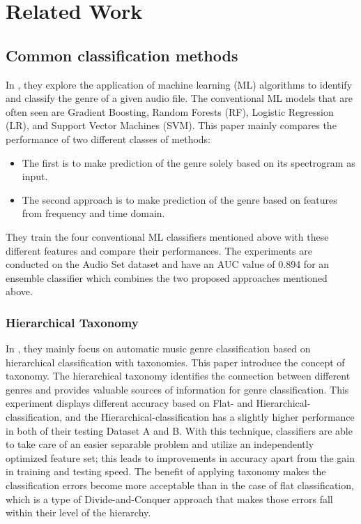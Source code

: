 \section{Related Work}

\subsection{Common classification methods}

In \citet{Bahuleyan2018}, they explore the application of machine learning (ML) algorithms to identify and classify the genre of a given audio file. The conventional ML models that are often seen are Gradient Boosting, Random Forests (RF), Logistic Regression (LR), and Support Vector Machines (SVM). This paper mainly compares the performance of two different classes of methods:
\begin{itemize}
    \item The first is to make prediction of the genre solely based on its spectrogram as input.
    \item The second approach is to make prediction of the genre based on features from frequency and time domain.
\end{itemize}
They train the four conventional ML classifiers mentioned above with these different features and compare their performances. The experiments are conducted on the Audio Set dataset \cite{Gemmeke2017} and have an AUC value of 0.894 for an ensemble classifier which combines the two proposed approaches mentioned above.

\subsubsection{Hierarchical Taxonomy}

In \citet{Li2005}, they mainly focus on automatic music genre classification based on hierarchical classification with taxonomies. This paper introduce the concept of taxonomy. The hierarchical taxonomy identifies the connection between different genres and provides valuable sources of information for genre classification. This experiment displays different accuracy based on Flat- and Hierarchical-classification, and the  Hierarchical-classification has a slightly higher performance in both of their testing Dataset A and B.
With this technique, classifiers are able to take care of an easier separable problem and utilize an independently optimized feature set; this leads to improvements in accuracy apart from the gain in training and testing speed. The benefit of applying taxonomy makes the classification errors become more acceptable than in the case of flat classification, which is a type of Divide-and-Conquer approach that makes those errors fall within their level of the hierarchy.

